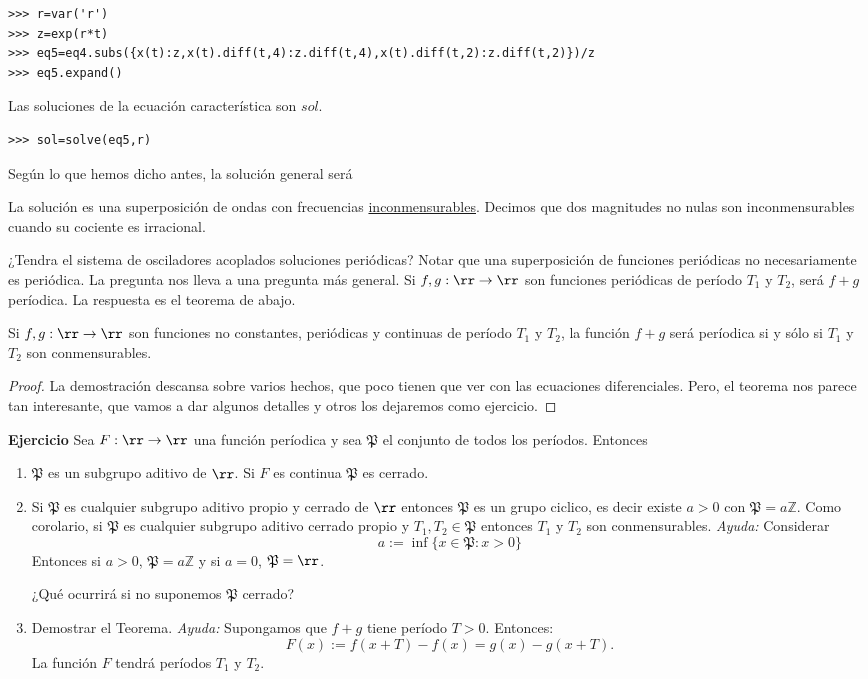 \begin{lstlisting}
>>> r=var('r')
>>> z=exp(r*t)
>>> eq5=eq4.subs({x(t):z,x(t).diff(t,4):z.diff(t,4),x(t).diff(t,2):z.diff(t,2)})/z
>>> eq5.expand()
\end{lstlisting}
Las soluciones de la ecuación característica son ${sol}$.
\begin{lstlisting}
>>> sol=solve(eq5,r)
\end{lstlisting}

Según lo que hemos dicho antes, la solución general será

La solución es una superposición de ondas con frecuencias \href{http://es.wikipedia.org/wiki/Conmensurabilidad_(matemática)}{inconmensurables}. Decimos que dos magnitudes no nulas son inconmensurables cuando su cociente es irracional.

¿Tendra el sistema de osciladores acoplados soluciones periódicas? Notar que una superposición de funciones periódicas no necesariamente es periódica.   La pregunta nos lleva a una pregunta más general. Si $f,g:\rr\to\rr$ son funciones periódicas de período $T_1$ y $T_2$, será $f+g$ períodica. La respuesta es el teorema de abajo.

\begin{teorema}{}  Si $f,g:\rr\to\rr$ son funciones no constantes, periódicas y continuas de período $T_1$ y $T_2$, la función $f+g$ será períodica si y sólo si $T_1$ y $T_2$ son conmensurables.
\end{teorema}

\begin{proof} La demostración descansa sobre varios hechos, que poco tienen que ver con las ecuaciones diferenciales. Pero, el teorema nos parece tan interesante, que vamos a dar algunos detalles y otros los dejaremos como ejercicio.
 \end{proof}


\noindent \textbf{Ejercicio} Sea $F:\rr\to\rr$ una función períodica y sea $\mathfrak{P}$ el conjunto de todos los períodos. Entonces
\begin{enumerate}
 \item $\mathfrak{P}$ es un subgrupo aditivo  de $\rr$. Si $F$ es continua $\mathfrak{P}$ es cerrado.
 \item Si $\mathfrak{P}$ es cualquier subgrupo aditivo propio y cerrado de $\rr$  entonces  $\mathfrak{P}$ es un grupo ciclico, es decir existe $a>0$ con $\mathfrak{P}=a\mathbb{Z}$.  Como corolario, si $\mathfrak{P}$ es cualquier subgrupo  aditivo cerrado propio  y $T_1,T_2\in \mathfrak{P}$ entonces $T_1$ y $T_2$ son conmensurables. \emph{Ayuda:} Considerar
\[a:=\inf\{x\in \mathfrak{P}:x>0\}\]
Entonces si $a>0$,  $\mathfrak{P}=a\mathbb{Z}$ y si $a=0$,  $\mathfrak{P}=\rr$.

¿Qué ocurrirá si no suponemos $\mathfrak{P}$ cerrado?

 \item Demostrar el Teorema. \emph{Ayuda:} Supongamos  que $f+g$ tiene período $T>0$. Entonces:
\[F(x):=f(x+T)-f(x)=g(x)-g(x+T).\]
La función $F$ tendrá períodos $T_1$ y $T_2$.
 \end{enumerate}

